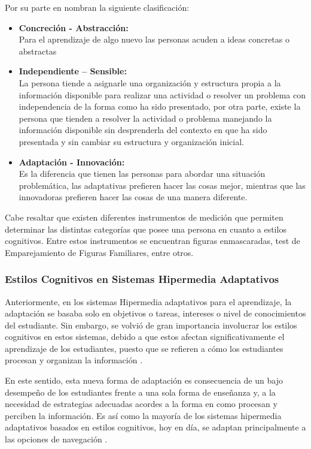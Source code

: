 Por su parte en \cite{Pantoja2012} nombran la siguiente clasificación:
\begin{itemize}
\item \textbf{Concreción - Abstracción:}\ \\
 Para el aprendizaje de algo nuevo las personas acuden a ideas concretas o abstractas

\item \textbf{	Independiente – Sensible:}\ \\
La persona tiende a asignarle una organización y estructura propia a la información disponible para realizar una actividad o resolver un problema con independencia de la forma como ha sido presentado, por otra parte, existe la persona que tienden a resolver la actividad o problema manejando la información disponible sin desprenderla del contexto en que ha sido presentada y sin cambiar su estructura y organización inicial. 

\item \textbf{	Adaptación - Innovación:} \ \\
Es la diferencia que tienen las personas para abordar una situación problemática, las adaptativas prefieren hacer las cosas mejor, mientras que las innovadoras prefieren hacer las cosas de una manera diferente.
\end{itemize}
Cabe resaltar que existen diferentes instrumentos de medición que permiten determinar las distintas categorías que posee una persona en cuanto a estilos cognitivos. Entre estos instrumentos se encuentran figuras enmascaradas, test de Emparejamiento de Figuras Familiares, entre otros.

\subsubsection{Estilos Cognitivos en Sistemas Hipermedia Adaptativos}
Anteriormente, en los sistemas Hipermedia adaptativos para el aprendizaje, la adaptación se basaba solo en objetivos o tareas, intereses o nivel de conocimientos del estudiante. Sin embargo, se volvió de gran importancia involucrar los estilos cognitivos en estos sistemas, debido a que estos afectan significativamente el aprendizaje de los estudiantes, puesto que se refieren a cómo los estudiantes procesan y organizan la información \cite{Mampadi2011}.

En este sentido, esta nueva forma de adaptación es consecuencia de un bajo desempeño de los estudiantes frente a una sola forma de enseñanza y, a la necesidad de estrategias adecuadas acordes a la forma en como procesan y perciben la información. Es así como la mayoría de los sistemas hipermedia adaptativos basados en estilos cognitivos, hoy en día, se adaptan principalmente a las opciones de navegación \cite{Ferraro2006}. 
